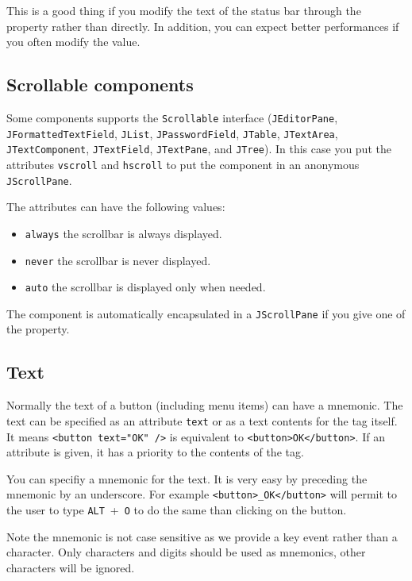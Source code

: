 \documentclass[a4paper,onecolumn,10pt]{book}
\newcommand{\jclass}[1]{\texttt{\small #1}}
\begin{document}
This is a good thing if you modify the text of the status bar through the
property rather than directly. In addition, you can expect better performances
if you often modify the value.
 
\subsection{\label{sec:Scrollable}Scrollable components}
Some components supports the \jclass{Scrollable} interface
(\jclass{JEditorPane}, \jclass{JFormattedTextField}, \jclass{JList},
\jclass{JPasswordField}, \jclass{JTable}, \jclass{JTextArea},
\jclass{JTextComponent}, \jclass{JTextField}, \jclass{JTextPane}, and
\jclass{JTree}). In this case you put the attributes \verb|vscroll|
and \verb|hscroll| to put the component in an anonymous \jclass{JScrollPane}.
 


The attributes can have the following values:
\begin{itemize}
	\item \verb|always| the scrollbar is always displayed.
  \item \verb|never| the scrollbar is never displayed.
  \item \verb|auto| the scrollbar is displayed only when needed.
\end{itemize}

The component is automatically encapsulated in a \jclass{JScrollPane}
if you give one of the property.


\subsection{\label{sec:textcontents}Text}
Normally the text of a button (including menu items) can have a mnemonic.
The text can be specified as an attribute \verb|text| or as a text contents
for the tag itself. It means \verb|<button text="OK" />| is equivalent to
\verb|<button>OK</button>|. If an attribute is given, it has a priority to
the contents of the tag.

 
You can specifiy a mnemonic for the text. It is very easy by preceding the
mnemonic by an underscore. For example \verb|<button>_OK</button>| will
permit to the user to type \verb|ALT|~+~\verb|O| to do the same than clicking
on the button.

Note the mnemonic is not case sensitive as we provide a key event rather than
a character. Only characters and digits should be used as mnemonics, other
characters will be ignored.
\end{document}
